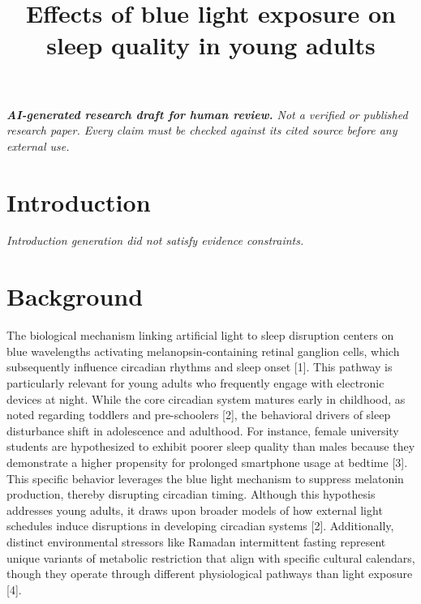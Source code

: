 \documentclass[conference]{IEEEtran}
\title{Effects of blue light exposure on sleep quality in young adults}
\author{\IEEEauthorblockN{ResearchGenie}\IEEEauthorblockA{AI-generated research draft}}
\begin{document}
\maketitle
\textit{\textbf{AI-generated research draft for human review.} Not a verified or published research paper. Every claim must be checked against its cited source before any external use.}\par

\section{Introduction}
\textit{Introduction generation did not satisfy evidence constraints.}

\section{Background}
The biological mechanism linking artificial light to sleep disruption centers on blue wavelengths activating melanopsin-containing retinal ganglion cells, which subsequently influence circadian rhythms and sleep onset [1]. This pathway is particularly relevant for young adults who frequently engage with electronic devices at night. While the core circadian system matures early in childhood, as noted regarding toddlers and pre-schoolers [2], the behavioral drivers of sleep disturbance shift in adolescence and adulthood. For instance, female university students are hypothesized to exhibit poorer sleep quality than males because they demonstrate a higher propensity for prolonged smartphone usage at bedtime [3]. This specific behavior leverages the blue light mechanism to suppress melatonin production, thereby disrupting circadian timing. Although this hypothesis addresses young adults, it draws upon broader models of how external light schedules induce disruptions in developing circadian systems [2]. Additionally, distinct environmental stressors like Ramadan intermittent fasting represent unique variants of metabolic restriction that align with specific cultural calendars, though they operate through different physiological pathways than light exposure [4].
\end{document}
